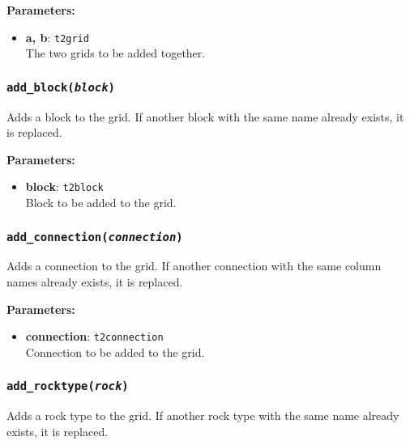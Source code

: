 \textbf{Parameters:}
\begin{itemize}
\item \textbf{a, b}: \texttt{t2grid}\\
  The two grids to be added together.
\end{itemize}

\begin{snugshade}
\subsubsection{\texttt{add\_block(\emph{block})}}
\end{snugshade}
\label{sec:t2grid:add_block}

Adds a block to the grid.  If another block with the same name already exists, it is replaced.

\textbf{Parameters:}
\begin{itemize}
\item \textbf{block}: \texttt{t2block}\\
  Block to be added to the grid.
\end{itemize}

\begin{snugshade}
\subsubsection{\texttt{add\_connection(\emph{connection})}}
\end{snugshade}
\label{sec:t2grid:add_connection}

Adds a connection to the grid.  If another connection with the same column names already exists, it is replaced.

\textbf{Parameters:}
\begin{itemize}
\item \textbf{connection}: \texttt{t2connection}\\
  Connection to be added to the grid.
\end{itemize}

\begin{snugshade}
\subsubsection{\texttt{add\_rocktype(\emph{rock})}}
\end{snugshade}
\label{sec:t2grid:add_rocktype}

Adds a rock type to the grid.  If another rock type with the same name already exists, it is replaced.


